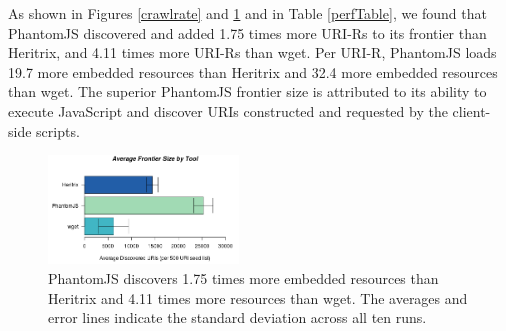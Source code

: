 \documentclass{ipres_proc_article-sp}
\begin{document}
As shown in Figures \ref{crawlrate} and \ref{frontiersize} and in Table \ref{perfTable}, we found that PhantomJS discovered and added 
1.75 times more URI-Rs to its frontier than Heritrix, and 4.11 times more URI-Rs than wget. Per URI-R, PhantomJS loads 19.7 more embedded resources than Heritrix and 32.4 more embedded resources than wget. The superior PhantomJS frontier size is attributed to its ability to execute JavaScript and discover URIs constructed and requested by the client-side scripts.

\begin{figure}
  \begin{center}
    \includegraphics[width=0.45\textwidth]{./imgs/sizeBarStats.png}
  \end{center}
  \caption{PhantomJS discovers 1.75 times more embedded resources than Heritrix and 4.11 times more resources than wget. The averages and error lines indicate the standard deviation across all ten runs.}
  \label{frontiersize}
\end{figure}


\end{document}
